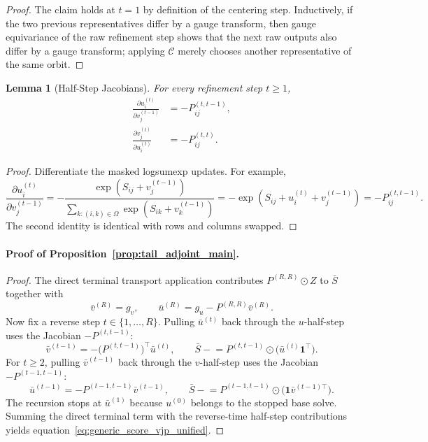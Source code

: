 \documentclass{article}
\newtheorem{lemma}{Lemma}
\begin{document}
\begin{proof}
The claim holds at $t=1$ by definition of the centering step. Inductively, if the two previous representatives differ by a gauge transform, then gauge equivariance of the raw refinement step shows that the next raw outputs also differ by a gauge transform; applying $\mathcal{C}$ merely chooses another representative of the same orbit.
\end{proof}

\begin{lemma}[Half-Step Jacobians]
For every refinement step $t\ge 1$,
\begin{align}
    \frac{\partial u_i^{(t)}}{\partial v_j^{(t-1)}} &= -P_{ij}^{(t,t-1)}, \\
    \frac{\partial v_j^{(t)}}{\partial u_i^{(t)}} &= -P_{ij}^{(t,t)}.
\end{align}
\end{lemma}

\begin{proof}
Differentiate the masked logsumexp updates. For example,
\[
\frac{\partial u_i^{(t)}}{\partial v_j^{(t-1)}}
=
-
\frac{\exp(S_{ij}+v_j^{(t-1)})}{\sum_{k:(i,k)\in\Omega}\exp(S_{ik}+v_k^{(t-1)})}
=
-\exp(S_{ij}+u_i^{(t)}+v_j^{(t-1)})
=
-P_{ij}^{(t,t-1)}.
\]
The second identity is identical with rows and columns swapped.
\end{proof}

\paragraph{Proof of Proposition~\ref{prop:tail_adjoint_main}.}
\begin{proof}
The direct terminal transport application contributes $P^{(R,R)}\odot Z$ to $\bar S$ together with
\[
\bar v^{(R)}=g_v,
\qquad
\bar u^{(R)}=g_u-P^{(R,R)}\bar v^{(R)}.
\]
Now fix a reverse step $t\in\{1,\dots,R\}$. Pulling $\bar u^{(t)}$ back through the $u$-half-step uses the Jacobian $-P^{(t,t-1)}$:
\[
\bar v^{(t-1)} = -\bigl(P^{(t,t-1)}\bigr)^\top \bar u^{(t)},
\qquad
\bar S \mathrel{-}= P^{(t,t-1)}\odot\bigl(\bar u^{(t)}\mathbf{1}^\top\bigr).
\]
For $t\ge 2$, pulling $\bar v^{(t-1)}$ back through the $v$-half-step uses the Jacobian $-P^{(t-1,t-1)}$:
\[
\bar u^{(t-1)} = -P^{(t-1,t-1)}\bar v^{(t-1)},
\qquad
\bar S \mathrel{-}= P^{(t-1,t-1)}\odot\bigl(\mathbf{1}\bar v^{(t-1)\top}\bigr).
\]
The recursion stops at $\bar u^{(1)}$ because $u^{(0)}$ belongs to the stopped base solve. Summing the direct terminal term with the reverse-time half-step contributions yields equation~\eqref{eq:generic_score_vjp_unified}.
\end{proof}
\end{document}
